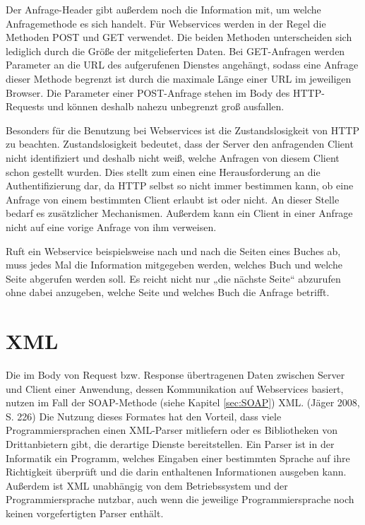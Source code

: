 Der Anfrage-Header gibt außerdem noch die Information mit, um welche Anfragemethode es sich handelt. Für Webservices werden in der Regel die Methoden POST und GET verwendet. Die beiden Methoden unterscheiden sich lediglich durch die Größe der mitgelieferten Daten. Bei GET-Anfragen werden Parameter an die \ac{URL} des aufgerufenen Dienstes angehängt, sodass eine Anfrage dieser Methode begrenzt ist durch die maximale Länge einer \ac{URL} im jeweiligen Browser. Die Parameter einer POST-Anfrage stehen im Body des \ac{HTTP}-Requests und können deshalb nahezu unbegrenzt groß ausfallen. \cite[S. 43]{Burbiel.2007}

Besonders für die Benutzung bei Webservices ist die Zustandslosigkeit von HTTP zu beachten. Zustandslosigkeit bedeutet, dass der Server den anfragenden Client nicht identifiziert und deshalb nicht weiß, welche Anfragen von diesem Client schon gestellt wurden. Dies stellt zum einen eine Herausforderung an die Authentifizierung dar, da \ac{HTTP} selbst so nicht immer bestimmen kann, ob eine Anfrage von einem bestimmten Client erlaubt ist oder nicht. An dieser Stelle bedarf es zusätzlicher Mechanismen. Außerdem kann ein Client in einer Anfrage nicht auf eine vorige Anfrage von ihm verweisen. \cite[S. 199]{Heiderich.2009}

Ruft ein Webservice beispielsweise nach und nach die Seiten eines Buches ab, muss jedes Mal die Information mitgegeben werden, welches Buch und welche Seite abgerufen werden soll. Es reicht nicht nur „die nächste Seite“ abzurufen ohne dabei anzugeben, welche Seite und welches Buch die Anfrage betrifft.

\section{XML}

Die im Body von Request bzw. Response übertragenen Daten zwischen Server und Client einer Anwendung, dessen Kommunikation auf Webservices basiert, nutzen im Fall der SOAP-Methode (siehe Kapitel \ref{sec:SOAP}) \ac{XML}. (Jäger 2008, S. 226) Die Nutzung dieses Formates hat den Vorteil, dass viele Programmiersprachen einen \ac{XML}-Parser mitliefern oder es Bibliotheken von Drittanbietern gibt, die derartige Dienste bereitstellen. \cite[S. 20]{Jager.2008} Ein Parser ist in der Informatik ein Programm, welches Eingaben einer bestimmten Sprache auf ihre Richtigkeit überprüft und die darin enthaltenen Informationen ausgeben kann. \cite[S. 3-4]{Naumann.1994} Außerdem ist \ac{XML} unabhängig von dem Betriebssystem und der Programmiersprache nutzbar, auch wenn die jeweilige Programmiersprache noch keinen vorgefertigten Parser enthält. \cite[S. 14]{Snell.2002}

